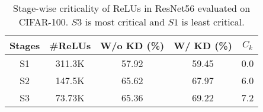 \begin{table} [htbp]
\caption{Stage-wise criticality of ReLUs in ResNet56 evaluated on CIFAR-100. $S3$ is most critical and $S1$ is least critical.}
\label{tab:ReluCriticalityR56}
\centering 
\begin{tabular}{ccccc} \toprule
Stages & \#ReLUs & W/o KD (\%) & W/ KD (\%) & $C_k$ \\ \toprule
S1 & 311.3K & 57.92 & 59.45 & 0.0 \\
S2 & 147.5K & 65.62 & 67.97 & 6.0 \\
S3 & 73.73K & 65.36 & 69.22 & 7.2 \\ \bottomrule
\end{tabular} 
\end{table}

